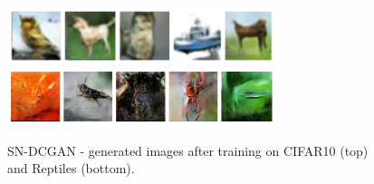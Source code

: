 \begin{figure}[H]
\centering
\includegraphics[width=0.7\textwidth]{../code/results/figures/images/sn-dcgan_cifar10}
\includegraphics[width=0.7\textwidth]{../code/results/figures/images/sn-dcgan_reptiles}
\caption{SN-DCGAN - generated images after training on CIFAR10 (top) and Reptiles (bottom).}
\end{figure}